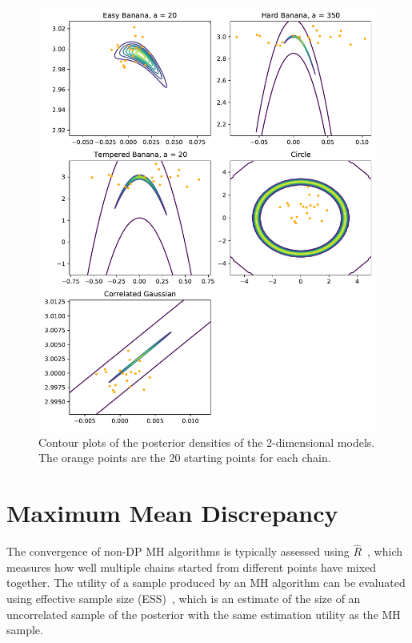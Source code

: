 \documentclass[english,twoside,openright]{HYgraduMLDS}
\begin{document}
\begin{figure}[h]
  \centering
  \includegraphics[width=\textwidth]{figures/posterior_plots}
  \caption{
    Contour plots of the posterior densities of the 2-dimensional models.
    The orange points are the 20 starting points for each chain.
  }
  \label{posterior_plots_fig}
\end{figure}

\section{Maximum Mean Discrepancy}\label{mmd_section}

The convergence of non-DP MH algorithms is typically assessed using
\(\hat{R}\)~\cite{BDA}, which measures how well multiple chains started from 
different points have mixed together. The utility of a sample produced by an 
MH algorithm can be evaluated using effective sample size (ESS)~\cite{BDA},
which is an estimate of the size of an uncorrelated sample of the posterior
with the same estimation utility as the MH sample.
\end{document}

